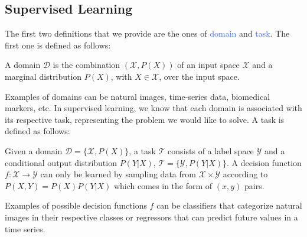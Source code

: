 \subsection{Supervised Learning}
The first two definitions that we provide are the ones of \textcolor{RoyalBlue}{domain} and \textcolor{RoyalBlue}{task}. The first one is defined as follows:
\begin{definition}
	A domain $\mathcal{D}$ is the combination $(\mathcal{X},P(X))$ of an input space $\mathcal{X}$ and a marginal distribution $P(X)$, with $X\in\mathcal{X}$, over the input space.
\end{definition}
Examples of domains can be natural images, time-series data, biomedical markers, etc. In supervised learning, we know that each domain is associated with its respective task, representing the problem we would like to solve. A task is defined as follows:
\begin{definition}
Given a domain $\mathcal{D}=\{\mathcal{X},P(X)\}$, a task $\mathcal{T}$ consists of a label space $\mathcal{Y}$ and a conditional output distribution $P(Y|X)$, $\mathcal{T}=\{\mathcal{Y},P(Y|X)\}$. A decision function $f:\mathcal{X}\rightarrow\mathcal{Y}$ can only be learned by sampling data from $\mathcal{X}\times\mathcal{Y}$ according to $P(X,Y)=P(X)P(Y|X)$ which comes in the form of $(x,y)$ pairs.
\end{definition}
Examples of possible decision functions $f$ can be classifiers that categorize natural images in their respective classes or regressors that can predict future values in a time series.


